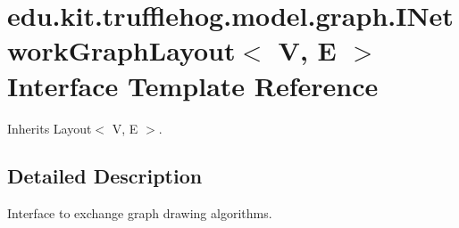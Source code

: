 \hypertarget{interfaceedu_1_1kit_1_1trufflehog_1_1model_1_1graph_1_1_i_network_graph_layout}{}\section{edu.\+kit.\+trufflehog.\+model.\+graph.\+I\+Network\+Graph\+Layout$<$ V, E $>$ Interface Template Reference}
\label{interfaceedu_1_1kit_1_1trufflehog_1_1model_1_1graph_1_1_i_network_graph_layout}


Inherits Layout$<$ V, E $>$.



\subsection{Detailed Description}
Interface to exchange graph drawing algorithms. 